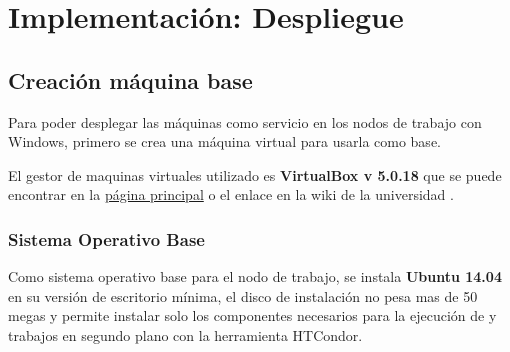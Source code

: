 
\chapter{Implementación: Despliegue} %

\label{Chapter4} %


\section{Creación máquina base}
Para poder desplegar las máquinas como servicio en los nodos de trabajo con Windows, primero se crea una máquina virtual para usarla como base.

El gestor de maquinas virtuales utilizado es \textbf{VirtualBox v 5.0.18} que se puede encontrar en la \href{https://www.virtualbox.org/wiki/Downloads}{página principal} o el enlace en la wiki de la universidad \autocite{hpc}.

\subsection*{Sistema Operativo Base}
Como sistema operativo base para el nodo de trabajo, se instala \textbf{Ubuntu 14.04} en su versión de escritorio mínima, el disco de instalación no pesa mas de 50 megas y permite instalar solo los componentes necesarios para la ejecución de y trabajos en segundo plano con la herramienta HTCondor.

